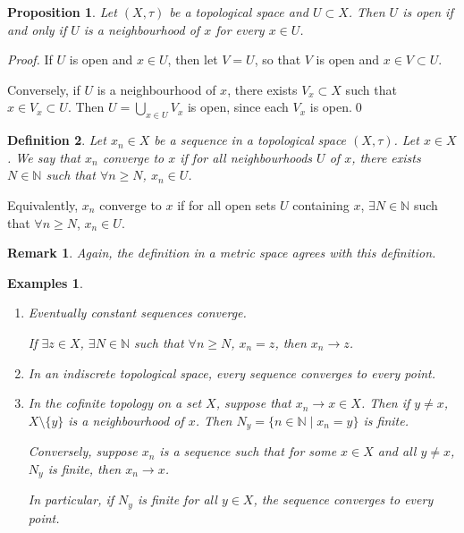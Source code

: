 \documentclass{article}
\theoremstyle{plain}\theoremheaderfont{\normalfont\itshape}\theorembodyfont{\rmfamily}\theoremseparator{.}\newtheorem*{rem}{Remark}\newtheorem*{ex}{Example}\newtheorem*{proof}{Proof}\newtheorem*{altp}{Alternative proof}
\theoremstyle{plain}\theoremheaderfont{\normalfont\bfseries}\theorembodyfont{\rmfamily}\theoremseparator{.}\newtheorem{thm}{Theorem}[section]\newtheorem{lem}[thm]{Lemma}\newtheorem{prop}[thm]{Proposition}\newtheorem*{cor}{Corollary}\newtheorem{defn}[thm]{Definition}\newtheorem{clm}[thm]{Claim}\newtheorem{clminproof}{Claim}
\theoremstyle{break}\theoremheaderfont{\normalfont\itshape}\theorembodyfont{\rmfamily}\theoremseparator{.\medskip}\newtheorem*{proofskip}{Proof}\newtheorem*{exs}{Examples}\newtheorem*{rems}{Remarks}
\theoremstyle{break}\theoremheaderfont{\normalfont\bfseries}\theorembodyfont{\rmfamily}\theoremseparator{.\medskip}\newtheorem{lemskip}[thm]{Lemma}\newtheorem{defnskip}[thm]{Definition}\newtheorem{propskip}[thm]{Proposition}\newtheorem{thmskip}[thm]{Theorem}
\newcommand{\qed}{\hfill\ensuremath{\Box}}
\begin{document}
    \begin{prop}
        Let \((X,\tau)\) be a topological space and \(U\subset X\). Then \(U\) is open if and only if \(U\) is a neighbourhood of \(x\) for every \(x\in U\).
    \end{prop}
    \begin{proof}
        If \(U\) is open and \(x\in U\), then let \(V=U\), so that \(V\) is open and \(x\in V\subset U\).

        Conversely, if \(U\) is a neighbourhood of \(x\), there exists \(V_x\subset X\) such that \(x\in V_x\subset U\). Then \(U=\bigcup_{x\in U}V_x\) is open, since each \(V_x\) is open.\qed
    \end{proof}

    \begin{defn}
        Let \(x_n\in X\) be a sequence in a topological space \((X,\tau)\). Let \(x\in X\). We say that \(x_n\) \textit{converge} to \(x\) if for all neighbourhoods \(U\) of \(x\), there exists \(N\in\mathbb{N}\) such that \(\forall n\ge N\), \(x_n\in U\).
    \end{defn}
    Equivalently, \(x_n\) converge to \(x\) if for all open sets \(U\) containing \(x\), \(\exists N\in\mathbb{N}\) such that \(\forall n\ge N\), \(x_n\in U\).

    \begin{rem}
        Again, the definition in a metric space agrees with this definition.
    \end{rem}
    
    \begin{exs}
        \begin{enumerate}[label=(\roman*),topsep=0pt]
            \item Eventually constant sequences converge.
            
            If \(\exists z\in X\), \(\exists N\in\mathbb{N}\) such that \(\forall n\ge N\), \(x_n= z\), then \(x_n\to z\).
            \item In an indiscrete topological space, every sequence converges to every point.
            \item In the cofinite topology on a set \(X\), suppose that \(x_n\to x\in X\). Then if \(y\ne x\), \(X\setminus\{y\}\) is a neighbourhood of \(x\). Then \(N_y=\{n\in\mathbb{N}\mid x_n=y\}\) is finite.
            
            Conversely, suppose \(x_n\) is a sequence such that for some \(x\in X\) and all \(y\ne x\), \(N_y\) is finite, then \(x_n\to x\).
            
            In particular, if \(N_y\) is finite for all \(y\in X\), the sequence converges to every point.
        \end{enumerate}
    \end{exs}
\end{document}
